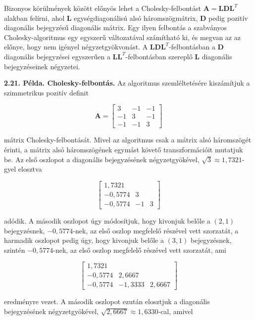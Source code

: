 \documentclass[
  magyar,
  11pt]{article}
\providecommand{\boldsymbol}[1]{\mathbf{#1}}
\begin{document}
Bizonyos körülmények között előnyös lehet a Cholesky-felbontást
\(\boldsymbol{A} = \boldsymbol{L}\boldsymbol{D}\boldsymbol{L}^T\)
alakban felírni, ahol \(\boldsymbol{L}\) egységdiagonálisú alsó
háromszögmátrix, \(\boldsymbol{D}\) pedig pozitív diagonális bejegyzésű
diagonális mátrix. Egy ilyen felbontás a szabványos Cholesky-algoritmus
egy egyszerű változatával számítható ki, és megvan az az előnye, hogy
nem igényel négyzetgyökvonást. A
\(\boldsymbol{L}\boldsymbol{D}\boldsymbol{L}^T\)-felbontásban a
\(\boldsymbol{D}\) diagonális bejegyzései egyszerűen a
\(\boldsymbol{L}\boldsymbol{L}^T\)-felbontásban szereplő
\(\boldsymbol{L}\) diagonális bejegyzéseinek négyzetei.

\textbf{2.21. Példa. Cholesky-felbontás.} Az algoritmus szemléltetésére
kiszámítjuk a szimmetrikus pozitív definit

\[\mathbf{A} = \begin{bmatrix} 3 & -1 & -1 \\ -1 & 3 & -1 \\ -1 & -1 & 3 \end{bmatrix}\]

mátrix Cholesky-felbontását. Mivel az algoritmus csak a mátrix alsó
háromszögét érinti, a mátrix alsó háromszögének egymást követő
transzformációit mutatjuk be. Az első oszlopot a diagonális
bejegyzésének négyzetgyökével, \(\sqrt{3} \approx 1{,}7321\)-gyel
elosztva

\[\begin{bmatrix} 1{,}7321 \\ -0{,}5774 & 3 \\ -0{,}5774 & -1 & 3 \end{bmatrix}\]

adódik. A második oszlopot úgy módosítjuk, hogy kivonjuk belőle a
\((2, 1)\) bejegyzésnek, \(-0{,}5774\)-nek, az első oszlop megfelelő
részével vett szorzatát, a harmadik oszlopot pedig úgy, hogy kivonjuk
belőle a \((3, 1)\) bejegyzésnek, szintén \(-0{,}5774\)-nek, az első
oszlop megfelelő részével vett szorzatát, ami

\[\begin{bmatrix} 1{,}7321 \\ -0{,}5774 & 2{,}6667 \\ -0{,}5774 & -1{,}3333 & 2{,}6667 \end{bmatrix}\]

eredményre vezet. A második oszlopot ezután elosztjuk a diagonális
bejegyzésének négyzetgyökével, \(\sqrt{2{,}6667} \approx 1{,}6330\)-cal,
amivel
\end{document}
